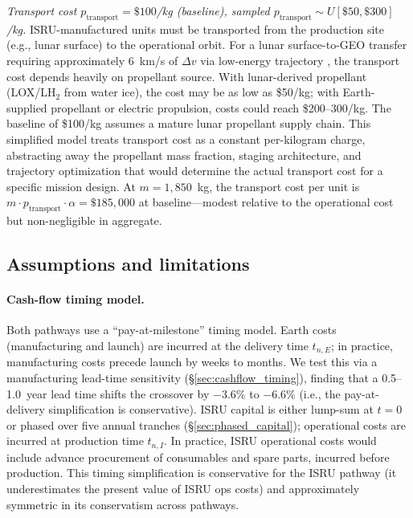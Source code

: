 \documentclass[preprint,12pt]{elsarticle}
\begin{document}
\emph{Transport cost $p_{\mathrm{transport}} = \$100$/kg (baseline), sampled $p_{\mathrm{transport}} \sim U[\$50, \$300]$/kg.} ISRU-manufactured units must be transported from the production site (e.g., lunar surface) to the operational orbit. For a lunar surface-to-GEO transfer requiring approximately 6~km/s of $\Delta v$ via low-energy trajectory \cite{ishimatsu2016}, the transport cost depends heavily on propellant source. With lunar-derived propellant (LOX/LH$_2$ from water ice), the cost may be as low as \$50/kg; with Earth-supplied propellant or electric propulsion, costs could reach \$200--300/kg. The baseline of \$100/kg assumes a mature lunar propellant supply chain. This simplified model treats transport cost as a constant per-kilogram charge, abstracting away the propellant mass fraction, staging architecture, and trajectory optimization that would determine the actual transport cost for a specific mission design. At $m = 1{,}850$~kg, the transport cost per unit is $m \cdot p_{\mathrm{transport}} \cdot \alpha = \$185{,}000$ at baseline---modest relative to the operational cost but non-negligible in aggregate.

\subsection{Assumptions and limitations}

\paragraph{Cash-flow timing model.} Both pathways use a ``pay-at-milestone'' timing model. Earth costs (manufacturing and launch) are incurred at the delivery time $t_{n,E}$; in practice, manufacturing costs precede launch by weeks to months. We test this via a manufacturing lead-time sensitivity (\S\ref{sec:cashflow_timing}), finding that a 0.5--1.0~year lead time shifts the crossover by $-$3.6\% to $-$6.6\% (i.e., the pay-at-delivery simplification is conservative). ISRU capital is either lump-sum at $t = 0$ or phased over five annual tranches (\S\ref{sec:phased_capital}); operational costs are incurred at production time $t_{n,I}$. In practice, ISRU operational costs would include advance procurement of consumables and spare parts, incurred before production. This timing simplification is conservative for the ISRU pathway (it underestimates the present value of ISRU ops costs) and approximately symmetric in its conservatism across pathways.
\end{document}
